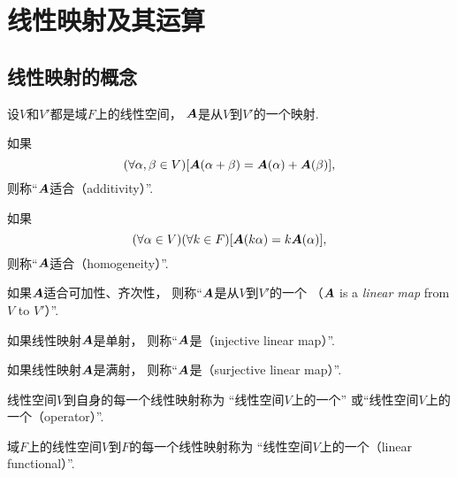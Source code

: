 \section{线性映射及其运算}
\subsection{线性映射的概念}
\begin{definition}\label{definition:线性映射.线性映射}
设\(V\)和\(V'\)都是域\(F\)上的线性空间，
\(\boldsymbol{A}\)是从\(V\)到\(V'\)的一个映射.

如果\begin{equation*}
	(\forall\alpha,\beta\in V)
	[\boldsymbol{A}(\alpha+\beta)=\boldsymbol{A}(\alpha)+\boldsymbol{A}(\beta)],
\end{equation*}
则称“\(\boldsymbol{A}\)适合（additivity）”.

如果\begin{equation*}
	(\forall\alpha\in V)
	(\forall k\in F)
	[\boldsymbol{A}(k\alpha)=k\boldsymbol{A}(\alpha)],
\end{equation*}
则称“\(\boldsymbol{A}\)适合（homogeneity）”.

如果\(\boldsymbol{A}\)适合可加性、齐次性，
则称“\(\boldsymbol{A}\)是从\(V\)到\(V'\)的一个%
（\(\boldsymbol{A}\) is a \emph{linear map} from \(V\) to \(V'\)）”.
\end{definition}

\begin{definition}
如果线性映射\(\boldsymbol{A}\)是单射，
则称“\(\boldsymbol{A}\)是（injective linear map）”.
\end{definition}

\begin{definition}
如果线性映射\(\boldsymbol{A}\)是满射，
则称“\(\boldsymbol{A}\)是（surjective linear map）”.
\end{definition}

\begin{definition}
线性空间\(V\)到自身的每一个线性映射称为
“线性空间\(V\)上的一个”
或“线性空间\(V\)上的一个（operator）”.
\end{definition}

\begin{definition}\label{definition:线性映射.线性函数}
域\(F\)上的线性空间\(V\)到\(F\)的每一个线性映射称为
“线性空间\(V\)上的一个（linear functional）”.
\end{definition}

